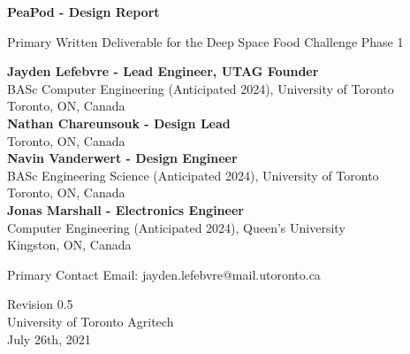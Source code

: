 \documentclass{report}
\begin{document}
\begin{titlepage}
    \begin{center}
        \vspace*{1.2cm}

        \textbf{\large{PeaPod - Design Report}}

        \vspace{0.5cm}

        Primary Written Deliverable for the Deep Space Food Challenge Phase 1

        \vfill \small{

            \textbf{Jayden Lefebvre - Lead Engineer, UTAG Founder}\\
            BASc Computer Engineering (Anticipated 2024), University of Toronto\\
            Toronto, ON, Canada\\
            \vspace{.5cm}
            \textbf{Nathan Chareunsouk - Design Lead}\\Toronto, ON, Canada\\
            \vspace{.5cm}
            \textbf{Navin Vanderwert - Design Engineer}\\
            BASc Engineering Science (Anticipated 2024), University of Toronto\\
            Toronto, ON, Canada\\
            \vspace{.5cm}
            \textbf{Jonas Marshall - Electronics Engineer}\\
            Computer Engineering (Anticipated 2024), Queen's University\\
            Kingston, ON, Canada

        }

        \vspace{1cm}

        Primary Contact Email: jayden.lefebvre@mail.utoronto.ca

        \vspace{.75cm}

        Revision 0.5\\
        University of Toronto Agritech\\
        July 26th, 2021

    \end{center}
\end{titlepage}

\thispagestyle{plain}
\end{document}
